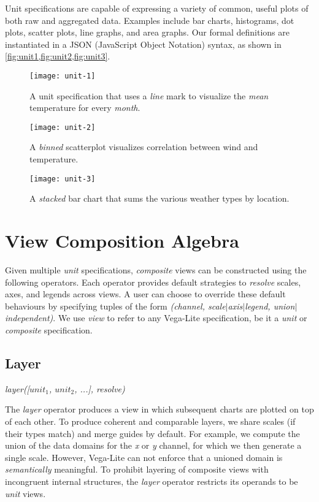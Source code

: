Unit specifications are capable of expressing a variety of common, useful plots
of both raw and aggregated data. Examples include bar charts, histograms, dot
plots, scatter plots, line graphs, and area graphs. Our formal definitions are
instantiated in a JSON (JavaScript Object Notation) syntax, as shown in
\cref{fig:unit1,fig:unit2,fig:unit3}.

\begin{figure}[h!]
\centering
  \texttt{[image: unit-1]}
  \caption{A unit specification that uses a \emph{line} mark to visualize the
  \emph{mean} temperature for every \emph{month}.}
  \label{fig:unit1}
\end{figure}

\begin{figure}[h!]
  \centering
  \texttt{[image: unit-2]}
  \caption{A \emph{binned} scatterplot visualizes correlation between wind
  and temperature.}
  \label{fig:unit2}
\end{figure}

\begin{figure}[h!]
  \centering
  \texttt{[image: unit-3]}
  \caption{A \emph{stacked} bar chart that sums the various weather types by
  location.}
  \label{fig:unit3}
\end{figure}

\newpage
\section{View Composition Algebra}

Given multiple \emph{unit} specifications, \emph{composite} views can be
constructed using the following operators. Each operator provides default
strategies to \emph{resolve} scales, axes, and legends across views. A user can
choose to override these default behaviours by specifying tuples of the form
\emph{(channel, scale$|$axis$|$legend, union$|$independent)}. We use \emph{view}
to refer to any Vega-Lite specification, be it a \emph{unit} or \emph{composite}
specification.

\subsection{Layer}

\centerline{
  \emph{layer([$unit_1$, $unit_2$, ...], resolve)}
}

The \emph{layer} operator produces a view in which subsequent charts are plotted
on top of each other. To produce coherent and comparable layers, we share scales
(if their types match) and merge guides by default. For example, we compute the
union of the data domains for the \emph{x} or \emph{y} channel, for which we
then generate a single scale. However, Vega-Lite can not enforce that a unioned
domain is \emph{semantically} meaningful. To prohibit layering of composite
views with incongruent internal structures, the \emph{layer} operator restricts
its operands to be \emph{unit} views.

